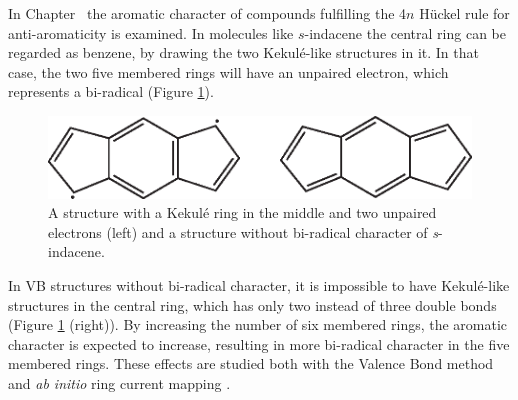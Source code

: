 In Chapter \chindacene\ the aromatic character of compounds fulfilling the 4$n$ H\"{u}ckel rule for anti-aromaticity is examined. In molecules like $s$-indacene the central ring can be regarded as benzene, by drawing the two Kekul\'e-like structures in it. In that case, the two five membered rings will have an unpaired electron, which represents a bi-radical (Figure \ref{ch1.fig.indacene}). 
\begin{figure}[htp]
\center
\includegraphics{introduction/figures/indacene.eps}
\caption{A structure with a Kekul\'e ring in the middle and two unpaired electrons (left) and a structure without bi-radical character of \textit{s}-indacene.}
\label{ch1.fig.indacene}
\end{figure}
In VB structures without bi-radical character, it is impossible to have Kekul\'e-like structures in the central ring, which has only two instead of three double bonds (Figure \ref{ch1.fig.indacene} (right)). By increasing the number of six membered rings, the aromatic character is expected to increase, resulting in more bi-radical character in the five membered rings. These effects are studied both with the Valence Bond method and \textit{ab initio} ring current mapping \cite{indacene}.  


 

